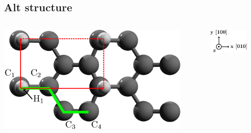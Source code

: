 \documentclass{beamer}
\begin{document}




\subsection{Alt structure}


\begin{frame}

\vspace{-3mm}
\begin{columns}

\flushright
\includegraphics[width=0.9\textwidth]{figs/alt1.pdf}

\vspace{5mm}

\flushleft
\includegraphics[width=0.9\textwidth]{figs/arrows1.pdf}

\end{columns}

\vspace{-5mm}

\begin{columns}


\end{columns}
\end{frame}
\end{document}
